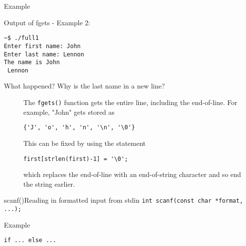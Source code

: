 \begin{frame}
  \begin{block}{Example}
    \begin{center}
    \end{center}
  \end{block}
\end{frame}

Output of fgets - Example 2:

\begin{verbatim}
~$ ./full1
Enter first name: John
Enter last name: Lennon
The name is John
 Lennon
\end{verbatim}

\begin{description}
\item[What happened? Why is the last name in a new line?]  The \texttt{fgets()} function gets the
  entire line, including the end-of-line. For example, "John" gets stored as
\begin{verbatim}
{'J', 'o', 'h', 'n', '\n', '\0'}
\end{verbatim}
  This can be fixed by using the statement
\begin{verbatim}
first[strlen(first)-1] = '\0';
\end{verbatim}
  which replaces the end-of-line with an end-of-string character and so end the string
  earlier.
\end{description}

\begin{frame}[fragile=singleslide]{scanf()}{Reading in formatted input from stdin}
  \texttt{int scanf(const char *format, ...);}
  \begin{block}{Example}
    \begin{center}
    \end{center}
  \end{block}
\end{frame}

\begin{frame}{\texttt{if ... else ...}}
\begin{center}
\end{center}
\end{frame}

